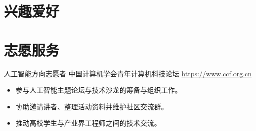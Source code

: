 \documentclass[a4paper, serif, 10pt]{moderncv}
\begin{document}
\section{兴趣爱好}

\section{志愿服务}

        {人工智能方向志愿者}
        {中国计算机学会青年计算机科技论坛}
        {\url{https://www.ccf.org.cn}}
        {}
        {\begin{itemize}
\item 参与人工智能主题论坛与技术沙龙的筹备与组织工作。
\item 协助邀请讲者、整理活动资料并维护社区交流群。
\item 推动高校学生与产业界工程师之间的技术交流。
\end{itemize}}
    
\end{document}
